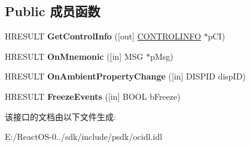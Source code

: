 \subsection*{Public 成员函数}
\begin{DoxyCompactItemize}
\item 
\mbox{\label{interface_i_ole_control_ac9d1956e1b7645e89af37e43b806a36b}} 
H\+R\+E\+S\+U\+LT {\bfseries Get\+Control\+Info} (\mbox{[}out\mbox{]} \hyperlink{struct_i_ole_control_1_1tag_c_o_n_t_r_o_l_i_n_f_o}{C\+O\+N\+T\+R\+O\+L\+I\+N\+FO} $\ast$p\+CI)
\item 
\mbox{\label{interface_i_ole_control_ab1d35f380fee140da23dfe4557ca5237}} 
H\+R\+E\+S\+U\+LT {\bfseries On\+Mnemonic} (\mbox{[}in\mbox{]} M\+SG $\ast$p\+Msg)
\item 
\mbox{\label{interface_i_ole_control_a618f946f51020fb5a2df19876314eca7}} 
H\+R\+E\+S\+U\+LT {\bfseries On\+Ambient\+Property\+Change} (\mbox{[}in\mbox{]} D\+I\+S\+P\+ID disp\+ID)
\item 
\mbox{\label{interface_i_ole_control_a2ede91f6f0b756c8eeb91b2d9194bd96}} 
H\+R\+E\+S\+U\+LT {\bfseries Freeze\+Events} (\mbox{[}in\mbox{]} B\+O\+OL b\+Freeze)
\end{DoxyCompactItemize}


该接口的文档由以下文件生成\+:\begin{DoxyCompactItemize}
\item 
E\+:/\+React\+O\+S-\/0../sdk/include/psdk/ocidl.\+idl\end{DoxyCompactItemize}
